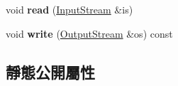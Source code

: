 \begin{DoxyCompactItemize}
\item 
void {\bfseries read} (\hyperlink{class_magnum_1_1_input_stream}{Input\+Stream} \&is)\hypertarget{class_magnum_1_1_color_r_g_b_a985d3eb7db74972e59d33e60465e1b5b}{}\label{class_magnum_1_1_color_r_g_b_a985d3eb7db74972e59d33e60465e1b5b}

\item 
void {\bfseries write} (\hyperlink{class_magnum_1_1_output_stream}{Output\+Stream} \&os) const \hypertarget{class_magnum_1_1_color_r_g_b_a7fb7e3f4b0db55222dbf566f15d7722f}{}\label{class_magnum_1_1_color_r_g_b_a7fb7e3f4b0db55222dbf566f15d7722f}

\end{DoxyCompactItemize}
\subsection*{靜態公開屬性}

